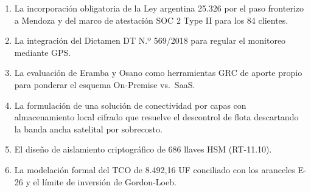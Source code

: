 \begin{enumerate}
\def\labelenumi{\arabic{enumi}.}
\tightlist
\item
  La incorporación obligatoria de la Ley argentina 25.326 por el paso fronterizo a Mendoza y del marco de atestación SOC 2 Type II para los 84 clientes.
\item
  La integración del Dictamen DT N.º 569/2018 para regular el monitoreo mediante GPS.
\item
  La evaluación de Eramba y Osano como herramientas GRC de aporte propio para ponderar el esquema On-Premise vs.~SaaS.
\item
  La formulación de una solución de conectividad por capas con almacenamiento local cifrado que resuelve el descontrol de flota descartando la banda ancha satelital por sobrecosto.
\item
  El diseño de aislamiento criptográfico de 686 llaves HSM (RT-11.10).
\item
  La modelación formal del TCO de 8.492,16 UF conciliado con los aranceles E-26 y el límite de inversión de Gordon-Loeb.
\end{enumerate}
